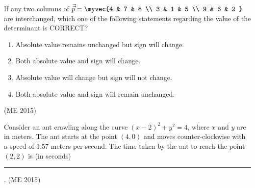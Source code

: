 \item If any two columns of 
$\Vec{\vec{p}} = \myvec{4 & 7 & 8 \\
                  3 & 1 & 5 \\
                  9 & 6 & 2 }$
are interchanged, which one of the following statements regarding the value of the determinant is CORRECT?
\begin{enumerate}
\item Absolute value remains unchanged but sign will change.  
\item Both absolute value and sign will change.  
\item Absolute value will change but sign will not change.  
\item Both absolute value and sign will remain unchanged.  
\end{enumerate}
\hfill  (ME 2015)
\item Consider an ant crawling along the curve $(x - 2)^2 + y^2 = 4$, where $x$ and $y$ are in meters. The ant starts at the point $(4, 0)$ and moves counter-clockwise with a speed of 1.57 meters per second. The time taken by the ant to reach the point $(2, 2)$ is (in seconds) \rule{1cm}{0.01pt}.
\hfill  (ME 2015)

